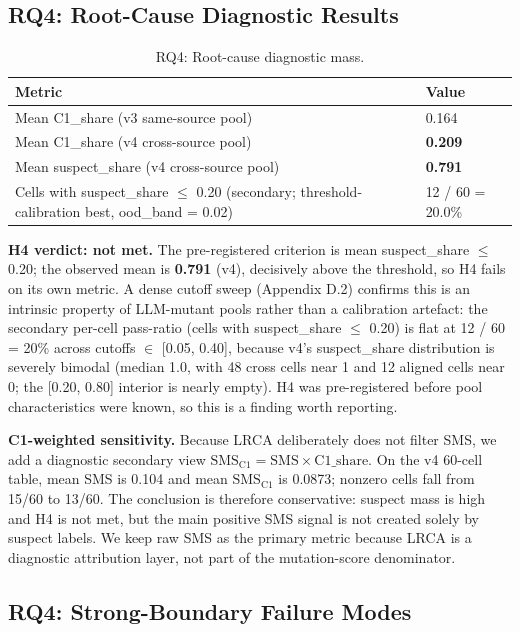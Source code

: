 \documentclass[manuscript,screen,review]{acmart}
\begin{document}
\subsection{RQ4: Root-Cause Diagnostic Results}\label{h5-lrca-mass}

\begin{table}[t]
\caption{RQ4: Root-cause diagnostic mass.}
\label{tab:p2-13}
\centering
\begin{tabular}{ll}
\toprule
Metric & Value \\
\midrule
Mean C1\_share (v3 same-source pool) & 0.164 \\
Mean C1\_share (v4 cross-source pool) & \textbf{0.209} \\
Mean suspect\_share (v4 cross-source pool) & \textbf{0.791} \\
Cells with suspect\_share $\leq$ 0.20 (secondary; threshold-calibration best, ood\_band = 0.02) & 12 / 60 = 20.0\% \\
\bottomrule
\end{tabular}
\end{table}

\textbf{H4 verdict: not met.} The pre-registered criterion is mean
suspect\_share $\leq$ 0.20; the observed mean is \textbf{0.791} (v4),
decisively above the threshold, so H4 fails on its own metric. A dense
cutoff sweep (Appendix D.2) confirms this is an intrinsic property of
LLM-mutant pools rather than a calibration artefact: the secondary
per-cell pass-ratio (cells with suspect\_share $\leq$ 0.20) is flat at
12 / 60 = 20\% across cutoffs $\in$ {[}0.05, 0.40{]}, because v4's
suspect\_share distribution is severely bimodal (median 1.0, with 48
cross cells near 1 and 12 aligned cells near 0; the {[}0.20, 0.80{]}
interior is nearly empty). H4 was pre-registered before pool
characteristics were known, so this is a finding worth reporting.

\textbf{C1-weighted sensitivity.} Because LRCA deliberately does not
filter SMS, we add a diagnostic secondary view
$\mathrm{SMS}_{\mathrm{C1}} = \mathrm{SMS} \times \mathrm{C1\_share}$.
On the v4 60-cell table, mean SMS is 0.104 and mean
$\mathrm{SMS}_{\mathrm{C1}}$ is 0.0873; nonzero cells fall from 15/60 to
13/60. The conclusion is therefore conservative: suspect mass is high
and H4 is not met, but the main positive SMS signal is not created solely
by suspect labels. We keep raw SMS as the primary metric because LRCA is
a diagnostic attribution layer, not part of the mutation-score
denominator.

\subsection{RQ4: Strong-Boundary Failure Modes}\label{rq4-strong-boundary}
\end{document}
